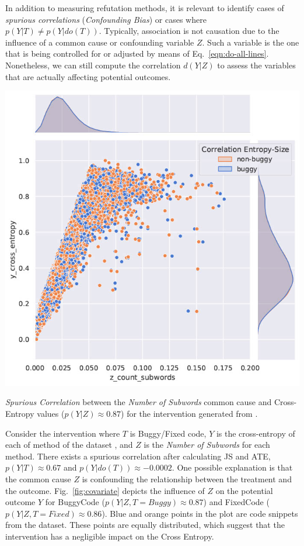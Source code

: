 In addition to measuring refutation methods, it is relevant to identify cases of \textit{spurious correlations} (\ie \textit{Confounding Bias}) or cases where $p(Y|T)\neq p(Y|do(T))$. Typically, association is not causation due to the influence of a common cause or confounding variable $Z$. Such a variable is the one that is being controlled for or adjusted by means of Eq.~\ref{eqn:do-all-lines}. Nonetheless, we can still compute the correlation $d(Y|Z)$ to assess the variables that are actually affecting potential outcomes. 

 \begin{marginfigure}
		\centering
		\includegraphics[width=\textwidth]{graphics/fig_4_covariates_corr.jpg}
		\caption{ \textit{Spurious Correlation} between the \textit{Number of Subwords} common cause and Cross-Entropy values ($p(Y|Z)\approx0.87$) for the \datainterI intervention generated from \tf. } 
        \vspace{-0.5cm}
        \label{fig:covariate}
\end{marginfigure}

\begin{exmp}
\label{exmp:confounding}

Consider the \datainterI intervention where $T$ is Buggy/Fixed code, $Y$ is the cross-entropy of each of method of the dataset \BuggyTB, and $Z$ is the \textit{Number of Subwords} for each method. There exists a spurious correlation after calculating JS and ATE, $p(Y|T)\approx0.67$ and $p(Y|do(T))\approx-0.0002$. One possible explanation is that the common cause $Z$ is confounding the relationship between the treatment and the outcome. Fig.~\ref{fig:covariate} depicts the influence of $Z$ on the potential outcome $Y$ for BuggyCode ($p(Y|Z,T=Buggy)\approx0.87$) and FixedCode ($p(Y|Z,T=Fixed)\approx0.86$). Blue and orange points in the plot are code snippets from the dataset. These points are equally distributed, which suggest that the \datainterI intervention has a negligible impact on the Cross Entropy. 
\end{exmp}